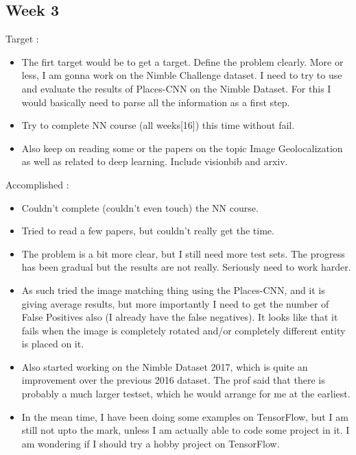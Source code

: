 \documentclass{article}
\begin{document}
\subsection{Week 3}
Target :
\begin{itemize}
\item The firt target would be to get a target. Define the problem clearly. More or less, I am gonna work on the Nimble Challenge dataset. I need to try to use and evaluate the results of Places-CNN on the Nimble Dataset. For this I would basically need to parse all the information as a first step.
\item Try to complete NN course (all weeks[16]) this time without fail.
\item Also keep on reading some or the papers on the topic Image Geolocalization as well as related to deep learning. Include visionbib and arxiv.
\end{itemize}

Accomplished :
\begin{itemize}
\item Couldn't complete (couldn't even touch) the NN course.
\item Tried to read a few papers, but couldn't really get the time.
\item The problem is a bit more clear, but I still need more test sets. The progress has been gradual but the results are not really. Seriously need to work harder.
\item As such tried the image matching thing using the Places-CNN, and it is giving average results, but more importantly I need to get the number of False Positives also (I already have the false negatives). It looks like that it fails when the image is completely rotated and/or completely different entity is placed on it.
\item Also started working on the Nimble Dataset 2017, which is quite an improvement over the previous 2016 dataset. The prof said that there is probably a much larger testset, which he would arrange for me at the earliest.
\item In the mean time, I have been doing some examples on TensorFlow, but I am still not upto the mark, unless I am actually able to code some project in it. I am wondering if I should try a hobby project on TensorFlow.
\end{itemize}
\end{document}
